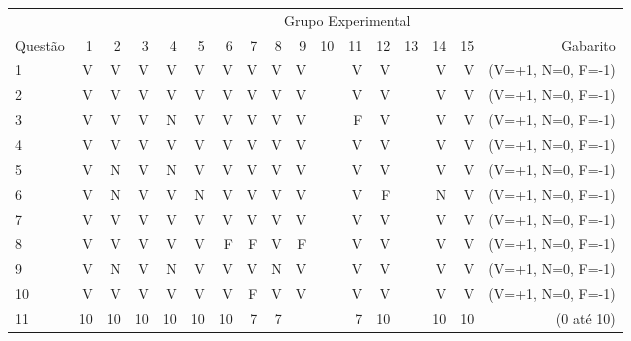 \begin{apendicesenv}
\begin{center}
	\hspace*{-0.8cm}
	\begin{tabular}{ l r r r r r r r r r r r r r r r r}
	\hline
	& \multicolumn{16}{c}{Grupo Experimental}\\
	\cline{2 - 16} %
	\multirow[c]{-2}{*}{Questão} & \textcolor[rgb]{0.9,0,0}{1} & \textcolor[rgb]{0.9,0,0}{2} & \textcolor[rgb]{0,0,0.9}{3} & \textcolor[rgb]{0,0,0.9}{4} & \textcolor[rgb]{0.9,0,0}{5} & \textcolor[rgb]{0.9,0,0}{6} & \textcolor[rgb]{0,0,0.9}{7} & \textcolor[rgb]{0,0,0.9}{8} & \textcolor[rgb]{0,0,0.9}{9} & \textcolor[rgb]{0.9,0,0}{10} & \textcolor[rgb]{0,0,0.9}{11} & \textcolor[rgb]{0.9,0,0}{12} & \textcolor[rgb]{0,0,0.9}{13} & \textcolor[rgb]{0,0,0.9}{14} & \textcolor[rgb]{0.9,0,0}{15}  & Gabarito\\
	\hline
	1	&	V	&	V	&	V	&	V	&	V	&	V	&	V	&	V	&	V	&       &	V	&	V	&       &	V	&	V	&	(V=+1, N=0, F=-1)	\\
	2	&	V	&	V	&	V	&	V	&	V	&	V	&	V	&	V	&	V	&       &	V	&	V	&       &	V	&	V	&	(V=+1, N=0, F=-1)	\\
	3	&	V	&	V	&	V	&	N	&	V	&	V	&	V	&	V	&	V	&       &	F	&	V	&       &	V	&	V	&	(V=+1, N=0, F=-1)	\\
	4	&	V	&	V	&	V	&	V	&	V	&	V	&	V	&	V	&	V	&       &	V	&	V	&       &	V	&	V	&	(V=+1, N=0, F=-1)	\\
	5	&	V	&	N	&	V	&	N	&	V	&	V	&	V	&	V	&	V	&       &	V	&	V	&       &	V	&	V	&	(V=+1, N=0, F=-1)	\\
	6	&	V	&	N	&	V	&	V	&	N	&	V	&	V	&	V	&	V	&       &	V	&	F	&       &	N	&	V	&	(V=+1, N=0, F=-1)	\\
	7	&	V	&	V	&	V	&	V	&	V	&	V	&	V	&	V	&	V	&       &	V	&	V	&       &	V	&	V	&	(V=+1, N=0, F=-1)	\\
	8	&	V	&	V	&	V	&	V	&	V	&	F	&	F	&	V	&	F	&       &	V	&	V	&       &	V	&	V	&	(V=+1, N=0, F=-1)	\\
	9	&	V	&	N	&	V	&	N	&	V	&	V	&	V	&	N	&	V	&       &	V	&	V	&       &	V	&	V	&	(V=+1, N=0, F=-1)	\\
	10	&	V	&	V	&	V	&	V	&	V	&	V	&	F	&	V	&	V	&       &	V	&	V	&       &	V	&	V	&	(V=+1, N=0, F=-1)	\\
	11	&	10	&	10	&	10	&	10	&	10	&	10	&	7	&	7	&		&       &	7	&	10	&       &	10	&	10	&	(0 até 10)	\\
	\hline
	\bottomrule
	\end{tabular}
\end{center}



\end{apendicesenv}
